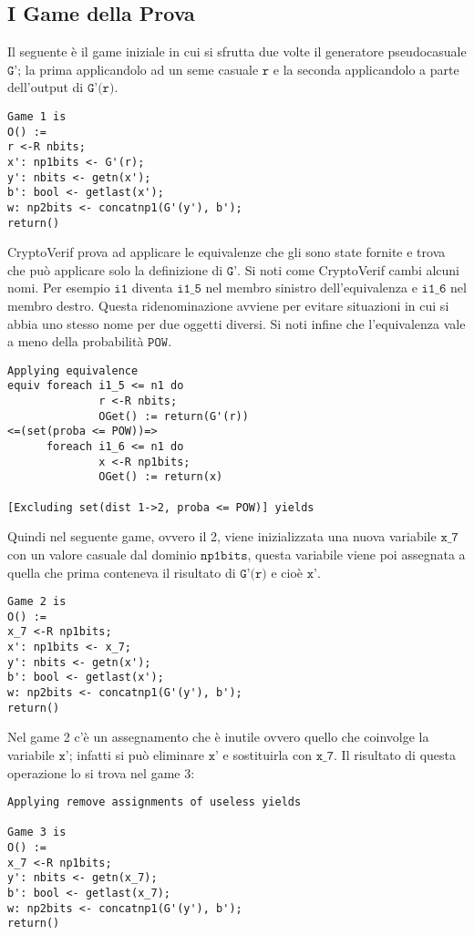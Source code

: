 \documentclass[a4paper,openright,twoside,12pt]{report}
\begin{document}
\subsection{I Game della Prova}
Il seguente \`e il game iniziale in cui si sfrutta due volte il generatore pseudocasuale $\texttt{G'}$; 
la prima applicandolo ad un seme casuale $\texttt{r}$ e la seconda applicandolo a parte dell'output di $\texttt{G'(r)}$.
\begin{verbatim}
Game 1 is
O() :=
r <-R nbits;
x': np1bits <- G'(r);
y': nbits <- getn(x');
b': bool <- getlast(x');
w: np2bits <- concatnp1(G'(y'), b');
return()
\end{verbatim}
CryptoVerif prova ad applicare le equivalenze che gli sono state fornite e trova che pu\`o applicare solo la definizione di $\texttt{G'}$.
Si noti come CryptoVerif cambi alcuni nomi. Per esempio $\texttt{i1}$ diventa $\texttt{i1\_5}$ nel membro sinistro dell'equivalenza e $\texttt{i1\_6}$ nel membro destro.
Questa ridenominazione avviene per evitare situazioni in cui si abbia uno stesso nome per due oggetti diversi. Si noti infine che l'equivalenza vale a meno della probabilit\`a $\texttt{POW}$.
\begin{verbatim}
Applying equivalence
equiv foreach i1_5 <= n1 do 
              r <-R nbits; 
              OGet() := return(G'(r))
<=(set(proba <= POW))=>
      foreach i1_6 <= n1 do 
              x <-R np1bits; 
              OGet() := return(x)

[Excluding set(dist 1->2, proba <= POW)] yields
\end{verbatim}
Quindi nel seguente game, ovvero il 2, viene inizializzata una nuova variabile $\texttt{x\_7}$ con un valore casuale dal dominio  $\texttt{np1bits}$, questa variabile viene poi assegnata a quella che prima
conteneva il risultato di $\texttt{G'(r)}$ e cio\`e $\texttt{x'}$.
\begin{verbatim} 
Game 2 is
O() :=
x_7 <-R np1bits;
x': np1bits <- x_7;
y': nbits <- getn(x');
b': bool <- getlast(x');
w: np2bits <- concatnp1(G'(y'), b');
return()
\end{verbatim}
Nel game 2 c'\`e un assegnamento che \`e inutile ovvero quello che coinvolge la variabile $\texttt{x'}$; infatti si pu\`o eliminare  $\texttt{x'}$ e sostituirla con  $\texttt{x\_7}$. 
Il risultato di questa operazione lo si trova nel game 3:
\begin{verbatim} 
Applying remove assignments of useless yields

Game 3 is
O() :=
x_7 <-R np1bits;
y': nbits <- getn(x_7);
b': bool <- getlast(x_7);
w: np2bits <- concatnp1(G'(y'), b');
return()
\end{verbatim}
\end{document}
